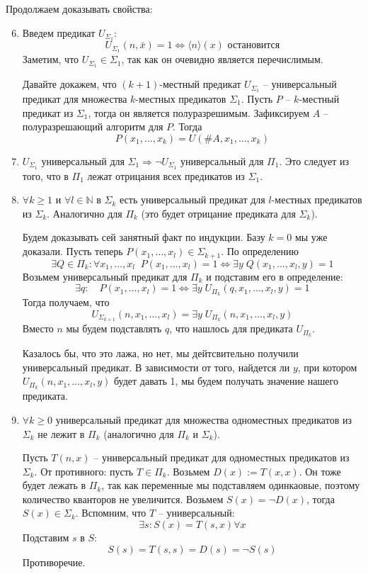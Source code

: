 Продолжаем доказывать свойства: \begin{enumerate}
    \setcounter{enumi}{5}
    \item Введем предикат $U_{\Sigma_1}$: \[ U_{\Sigma_1}(n, \bar{x}) = 1 \Leftrightarrow \langle n \rangle (x) \text{ остановится} \]
    Заметим, что $U_{\Sigma_1} \in \Sigma_1$, так как он очевидно является перечислимым.

    Давайте докажем, что $(k+1)$-местный предикат $U_{\Sigma_1}$ -- универсальный предикат для множества $k$-местных предикатов $\Sigma_1$. Пусть $P$ -- $k$-местный предикат из $\Sigma_1$, тогда он является полуразрешимым. Зафиксируем $A$ -- полуразрешающий алгоритм для $P$. Тогда \[ P(x_1, \dots, x_k) = U(\#A, x_1, \dots, x_k) \]

    \item $U_{\Sigma_1}$ универсальный для $\Sigma_1 \Longrightarrow \lnot U_{\Sigma_1}$ универсальный для $\Pi_1$. Это следует из того, что в $\Pi_1$ лежат отрицания всех предикатов из $\Sigma_1$.
    \item $\forall k \geqslant 1$ и $\forall l \in \mathbb{N}$ в $\Sigma_k$ есть универсальный предикат для $l$-местных предикатов из $\Sigma_k$. Аналогично для $\Pi_k$ (это будет отрицание предиката для $\Sigma_k$).
    
    Будем доказывать сей занятный факт по индукции. Базу $k = 0$ мы уже доказали. Пусть теперь $P(x_1, \dots, x_l) \in \Sigma_{k+1}$. По определению \[ \exists Q \in \Pi_k : \forall x_1, \dots, x_l \;\; P(x_1, \dots, x_l) = 1 \Leftrightarrow \exists y \; Q(x_1, \dots, x_l, y) = 1 \] Возьмем универсальный предикат для $\Pi_k$ и подставим его в определение: \[ \exists q : \quad P(x_1, \dots, x_l) = 1 \Leftrightarrow \exists y \; U_{\Pi_k}(q, x_1, \dots, x_l, y) = 1 \] Тогда получаем, что \[ U_{\Sigma_{k+1}}(n, x_1, \dots, x_l) =   \exists y \; U_{\Pi_k}(n, x_1, \dots, x_l, y) \] Вместо $n$ мы будем подставлять $q$, что нашлось для предиката $U_{\Pi_k}$. 

    Казалось бы, что это лажа, но нет, мы дейтсвительно получили универсальный предикат. В зависимости от того, найдется ли $y$, при котором $U_{\Pi_k}(n, x_1, \dots, x_l, y)$ будет давать 1, мы будем получать значение нашего предиката.

    \item $\forall k \geqslant 0$ универсальный предикат для множества одноместных предикатов из $\Sigma_k$ не лежит в $\Pi_k$ (аналогично для $\Pi_k$ и $\Sigma_k$).
    
    Пусть $T(n, x)$ -- универсальный предикат для одноместных предикатов из $\Sigma_k$. От противного: пусть $T \in \Pi_k$. Возьмем $D(x) := T(x, x)$. Он тоже будет лежать в $\Pi_k$, так как переменные мы подставляем одинкаовые, поэтому количество кванторов не увеличится. Возьмем $S(x) = \lnot D(x)$, тогда $S(x) \in \Sigma_k$. Вспомним, что $T$ -- универсальный: \[ \exists s : S(x) = T(s, x) \forall x \]
    Подставим $s$ в $S$: \[ S(s) = T(s, s) = D(s) = \lnot S(s) \]
    Противоречие.


\end{enumerate}
